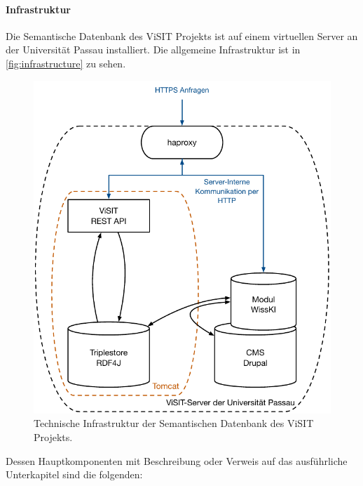 \paragraph{Infrastruktur}

Die Semantische Datenbank des ViSIT Projekts ist auf einem virtuellen Server an der Universität Passau installiert. Die allgemeine Infrastruktur ist in \autoref{fig:infrastructure} zu sehen.

\begin{figure}[htb]
    \centering
    \includegraphics[width=\textwidth]{Figures/berndl/infrastructure}
    \caption{\label{fig:infrastructure} Technische Infrastruktur der Semantischen Datenbank des ViSIT Projekts.}
\end{figure}

Dessen Hauptkomponenten mit Beschreibung oder Verweis auf das ausführliche Unterkapitel sind die folgenden:

